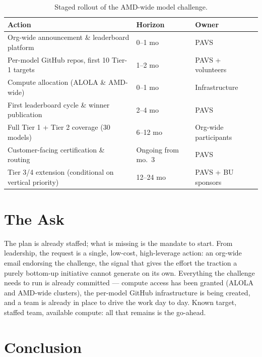 \documentclass[blind]{gtac}
\begin{document}
\begin{table}[H]
\centering
\caption{Staged rollout of the AMD-wide model challenge.}
\label{tab:roadmap}
\tiny
\begin{tabular}{@{}p{1.3in}p{0.55in}p{0.6in}@{}}
\toprule
Action & Horizon & Owner \\
\midrule
Org-wide announcement \& leaderboard platform & 0--1 mo & PAVS \\
Per-model GitHub repos, first 10 Tier-1 targets & 1--2 mo & PAVS + volunteers \\
Compute allocation (ALOLA \& AMD-wide) & 0--1 mo & Infrastructure \\
First leaderboard cycle \& winner publication & 2--4 mo & PAVS \\
Full Tier 1 + Tier 2 coverage (30 models) & 6--12 mo & Org-wide participants \\
Customer-facing certification \& routing & Ongoing from mo.\ 3 & PAVS \\
Tier 3/4 extension (conditional on vertical priority) & 12--24 mo & PAVS + BU sponsors \\
\bottomrule
\end{tabular}
\end{table}

\section{The Ask}
\label{sec:ask}

The plan is already staffed; what is missing is the mandate to start. From leadership, the request is a single, low-cost, high-leverage action: an org-wide email endorsing the challenge, the signal that gives the effort the traction a purely bottom-up initiative cannot generate on its own. Everything the challenge needs to run is already committed --- compute access has been granted (ALOLA and AMD-wide clusters), the per-model GitHub infrastructure is being created, and a team is already in place to drive the work day to day. Known target, staffed team, available compute: all that remains is the go-ahead.

\section{Conclusion}
\label{sec:conclusion}
\end{document}
